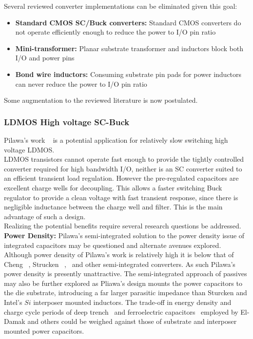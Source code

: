 \documentclass[letterpaper,twocolumn,10pt]{article}
\begin{document}
Several reviewed converter implementations can be eliminated given this goal:
\begin{itemize}
\item{\textbf{Standard CMOS SC/Buck converters: }Standard CMOS converters do not operate efficiently enough to reduce the power to I/O pin ratio}
\item{\textbf{Mini-transformer: }Planar substrate transformer and inductors block both I/O and power pins }
\item{\textbf{Bond wire inductors: }Consuming substrate pin pads for power inductors can never reduce the power to I/O pin ratio}
\end{itemize}   
Some augmentation to the reviewed literature is now postulated.\\
\subsubsection{LDMOS High voltage SC-Buck}
Pilawa's work ~\cite{Pilawa2012} is a potential application for relatively slow switching high voltage LDMOS.\\
LDMOS transistors cannot operate fast enough to provide the tightly controlled converter required for high bandwidth I/O, neither is an SC converter suited to an efficient transient load regulation. However the pre-regulated capacitors are excellent charge wells for decoupling. This allows a faster switching Buck regulator to provide a clean voltage with fast transient response, since there is negligible inductance between the charge well and filter. This is the main advantage of such a design.\\
Realizing the potential benefits require several research questions be addressed.\\

\textbf{Power Density: }Pilawa's semi-integrated solution to the power density issue of integrated capacitors may be questioned and alternate avenues explored. Although power density of Pilawa's work is relatively high it is below that of Cheng ~\cite{Cheng2013}, Strucken ~\cite{Sturcken2012},~\cite{Sturcken2013} and other semi-integrated converters. As such Pilawa's power density is presently unattractive. The semi-integrated approach of passives may also be further explored as Pliawa's design mounts the power capacitors to the die substrate, introducing a far larger parasitic impedance than Sturcken and Intel's $Si$ interposer mounted inductors. The trade-off in energy density and charge cycle periods of deep trench~\cite{Andersen2013} and ferroelectric capacitors~\cite{Damak2013} employed by El-Damak and others could be weighed against those of substrate and interposer mounted power capacitors.\\   
\end{document}
